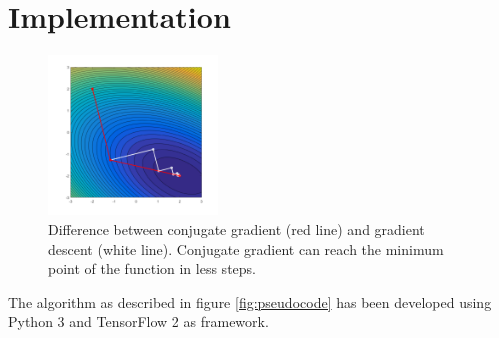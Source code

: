 \documentclass[11pt]{article}
\begin{document}
\section{Implementation}
\begin{figure}
        \includegraphics[width=0.4\textwidth]{gradient}
        \centering
        \caption{Difference between conjugate gradient (red line) and gradient descent
        (white line). Conjugate gradient can reach the minimum point of
        the function in less steps.}
        \label{fig:gradient}
\end{figure}
The algorithm as described in figure \ref{fig:pseudocode} has been developed using Python
3 and TensorFlow 2 as framework.
\end{document}
